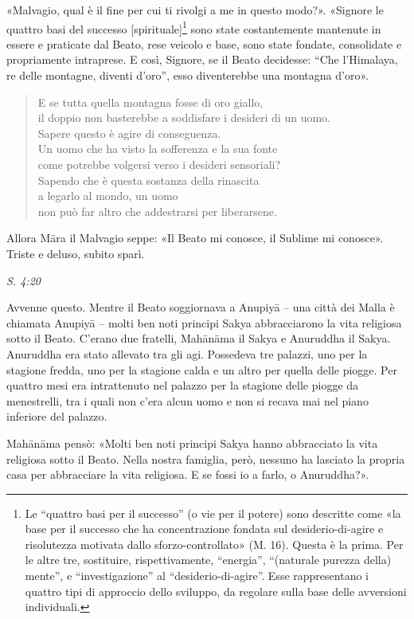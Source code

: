 «Malvagio, qual è il fine per cui ti rivolgi a me in questo modo?».
«Signore le quattro basi del successo [spirituale]\footnote{Le “quattro basi per il successo” (o vie per il potere) sono descritte come «la base per il successo che ha concentrazione fondata sul desiderio-di-agire e risolutezza motivata dallo sforzo-controllato» (M. 16). Questa è la prima. Per le altre tre, sostituire, rispettivamente, “energia”, “(naturale purezza della) mente”, e “investigazione” al “desiderio-di-agire”. Esse rappresentano i quattro tipi di approccio dello sviluppo, da regolare sulla base delle avversioni individuali.} sono state costantemente mantenute
in essere e praticate dal Beato, rese
veicolo e base, sono state fondate, consolidate e propriamente
intraprese. E così, Signore, se il Beato decidesse: “Che l’Himalaya, re
delle montagne, diventi d’oro”, esso diventerebbe una montagna d’oro».


\begin{quote}
E se tutta quella montagna fosse di oro giallo, \\
il doppio non basterebbe a soddisfare i desideri di un uomo. \\
Sapere questo è agire di conseguenza. \\
Un uomo che ha visto la sofferenza e la sua fonte \\
come potrebbe volgersi verso i desideri sensoriali? \\
Sapendo che è questa sostanza della rinascita \\
a legarlo al mondo, un uomo \\
non può far altro che addestrarsi per liberarsene.
\end{quote}

Allora Māra il Malvagio seppe: «Il Beato mi conosce, il Sublime mi
conosce». Triste e deluso, subito sparì.


\emph{S. 4:20}


 Avvenne questo. Mentre il Beato soggiornava a Anupiyā –
una città dei Malla è chiamata Anupiyā – molti ben noti principi Sakya
abbracciarono la vita religiosa sotto il Beato. C’erano due fratelli,
Mahānāma il Sakya e Anuruddha il Sakya. Anuruddha era stato allevato tra
gli agi. Possedeva tre palazzi, uno per la stagione fredda, uno per la
stagione calda e un altro per quella delle piogge. Per quattro mesi era
intrattenuto nel palazzo per la stagione delle piogge da menestrelli,
tra i quali non c’era alcun uomo e non si recava mai nel piano inferiore
del palazzo.


Mahānāma pensò: «Molti ben noti principi Sakya hanno abbracciato la vita
religiosa sotto il Beato. Nella nostra famiglia, però, nessuno ha
lasciato la propria casa per abbracciare la vita religiosa. E se fossi
io a farlo, o Anuruddha?».


